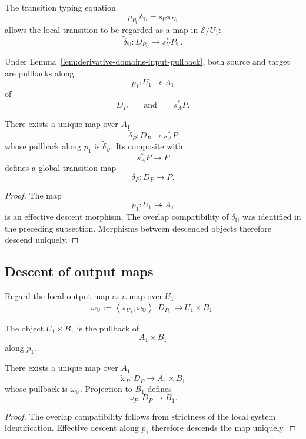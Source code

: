 The transition typing equation
\[
    p_{P_{\mathbb U}}\delta_{\mathbb U}
    =
    s_U\pi_{U_1}
\]
allows the local transition to be regarded as a map in
\(\mathcal E/U_1\):
\[
    \widetilde\delta_{\mathbb U}:
    D_{P_{\mathbb U}}
    \to
    s_U^\ast P_{\mathbb U}.
\]

Under
Lemma~\ref{lem:derivative-domains-input-pullback},
both source and target are pullbacks along
\[
    p_1:U_1\twoheadrightarrow A_1
\]
of
\[
    D_P
    \qquad\text{and}\qquad
    s_A^\ast P.
\]

\begin{proposition}
\label{prop:descent-transition-structure}
There exists a unique map over \(A_1\)
\[
    \widetilde\delta_P:
    D_P\to s_A^\ast P
\]
whose pullback along \(p_1\) is
\(\widetilde\delta_{\mathbb U}\).
Its composite with
\[
    s_A^\ast P\to P
\]
defines a global transition map
\[
    \delta_P:D_P\to P.
\]
\end{proposition}

\begin{proof}
The map
\[
    p_1:U_1\twoheadrightarrow A_1
\]
is an effective descent morphism. The overlap compatibility of
\(\widetilde\delta_{\mathbb U}\) was identified in the preceding subsection.
Morphisms between descended objects therefore descend uniquely.
\end{proof}

\subsection{Descent of output maps}
\label{subsec:descent-output-maps-rigorous}

Regard the local output map as a map over \(U_1\):
\[
    \widetilde\omega_{\mathbb U}
    :=
    \left\langle
        \pi_{U_1},
        \omega_{\mathbb U}
    \right\rangle:
    D_{P_{\mathbb U}}
    \to
    U_1\times B_1.
\]

The object \(U_1\times B_1\) is the pullback of
\[
    A_1\times B_1
\]
along \(p_1\).

\begin{proposition}
\label{prop:descent-output-structure}
There exists a unique map over \(A_1\)
\[
    \widetilde\omega_P:
    D_P\to A_1\times B_1
\]
whose pullback is
\(\widetilde\omega_{\mathbb U}\).
Projection to \(B_1\) defines
\[
    \omega_P:D_P\to B_1.
\]
\end{proposition}

\begin{proof}
The overlap compatibility follows from strictness of the local system
identification. Effective descent along \(p_1\) therefore descends the map
uniquely.
\end{proof}

